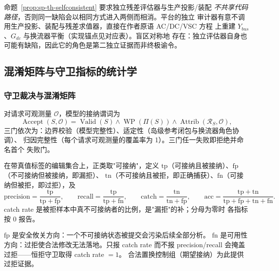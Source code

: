\begin{remark}[独立性的实现含义]
命题~\ref{prop:sp-th-selfconsistent} 要求独立残差评估器与生产投影/装配
\emph{不共享代码路径}，否则同一缺陷会以相同方式进入两侧而相消。平台的独立
审计器有意不调用生产投影、装配与残差求值器，直接在作者原语 AC/DC/VSC 方程
上重建 $Y_{bus}$、$G_{dc}$ 与换流器平衡（实现锚点见对应表）。盲区对称地
存在：独立评估器自身也可能有缺陷，因此它的角色是第二独立证据而非终极谕令。
\end{remark}

\subsection{混淆矩阵与守卫指标的统计学}\label{sec:sp-th-metrics}

\subsubsection{守卫裁决与混淆矩阵}
\begin{definition}[三门守卫]\label{def:sp-th-guard}
对请求可观测量 $\mathcal O$，模型的接纳谓词为
\begin{equation}
\operatorname{Accept}(S,\mathcal O)
=\operatorname{Valid}(S)\wedge\operatorname{WP}(\Pi(S))
\wedge\operatorname{Attrib}(\mathcal R_S,\mathcal O),
\label{eq:sp-th-accept}
\end{equation}
三门依次为：边界校验（模型完整性）、适定性（岛级参考闭包与换流器角色协调）、
归因完整性（每个请求可观测量的覆盖率为 1）。三门任一失败即拒绝并命名首个
失败门。
\end{definition}

\begin{definition}[混淆计数与派生指标]\label{def:sp-th-confusion}
在带真值标签的编辑集合上，正类取"可接纳"，定义
$\mathrm{tp}$（可接纳且被接纳）、$\mathrm{fp}$（不可接纳但被接纳，即漏拒）、
$\mathrm{tn}$（不可接纳且被拒，即正确捕获）、$\mathrm{fn}$（可接纳但被拒，即过拒），及
\begin{equation}
\mathrm{precision}=\frac{\mathrm{tp}}{\mathrm{tp}+\mathrm{fp}},\qquad
\mathrm{recall}=\frac{\mathrm{tp}}{\mathrm{tp}+\mathrm{fn}},\qquad
\mathrm{catch}=\frac{\mathrm{tn}}{\mathrm{tn}+\mathrm{fp}},\qquad
\mathrm{acc}=\frac{\mathrm{tp}+\mathrm{tn}}{\mathrm{tp}+\mathrm{fp}+\mathrm{tn}+\mathrm{fn}}.
\end{equation}
catch rate 是被拒样本中真不可接纳者的比例，是"漏拒"的补；分母为零时
各指标按 $0$ 报告。
\end{definition}

\begin{remark}[指标的解读边界]
$\mathrm{fp}$ 是安全攸关方向：一个不可接纳状态被提交会污染后续全部分析。
$\mathrm{fn}$ 是可用性方向：过拒使合法修改无法落地。只报 catch rate 而不报
precision/recall 会掩盖过拒——恒拒守卫取得 catch rate $=1$。
合法置换控制组（期望接纳）为此提供过拒证据。
\end{remark}

